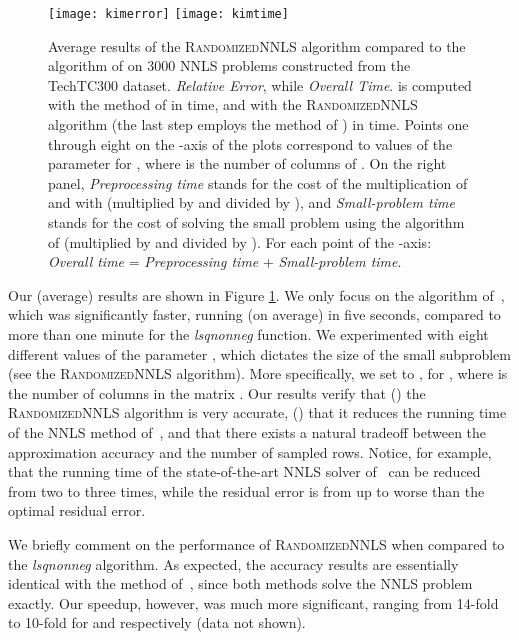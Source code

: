 \documentclass[11pt]{article}
\begin{document}
\begin{figure}
\label{fig:results}
    \begin{center}
    \texttt{[image: kimerror]}
    \texttt{[image: kimtime]}
    \end{center}
    \caption{
    Average results of the \textsc{RandomizedNNLS}
    algorithm compared to the algorithm of \cite{KSD07} on 3000 NNLS
    problems constructed from the TechTC300 dataset.
    \emph{Relative Error}, while \emph{Overall Time}.  is computed with the method of \cite{KSD07} in
     time, and   with the \textsc{RandomizedNNLS} algorithm (the last step employs the method of \cite{KSD07}) in
     time. Points one through eight on the -axis of the plots
    correspond to values of the parameter  for , where  is the number of columns of .
    On the right panel, \emph{Preprocessing
    time} stands for the cost of the multiplication of  and  with  (multiplied by  and divided by ), and \emph{Small-problem time} stands
    for the cost of solving the small problem using the algorithm
    of \cite{KSD07} (multiplied by  and divided by ). For each point of the -axis: \emph{Overall time} = \emph{Preprocessing
    time} +  \emph{Small-problem time}.}\label{fig:fig1}
\end{figure}

Our (average) results are shown in Figure \ref{fig:fig1}. We only
focus on the algorithm of~\cite{KSD07}, which was significantly
faster, running (on average) in five seconds, compared to more
than one minute for the \emph{lsqnonneg} function. We experimented
with eight different values of the parameter , which dictates
the size of the small subproblem (see the \textsc{RandomizedNNLS}
algorithm). More specifically, we set  to , for
, where  is the number of columns in the matrix
. Our results verify that () the \textsc{RandomizedNNLS}
algorithm is very accurate, () that it reduces the running
time of the NNLS method of~\cite{KSD07}, and  that there
exists a natural tradeoff between the approximation accuracy and
the number of sampled rows. Notice, for example, that the running
time of the state-of-the-art NNLS solver of~\cite{KSD07} can be
reduced from two to three times, while the residual error is from
 up to  worse than the optimal residual error.

We briefly comment on the performance of \textsc{RandomizedNNLS}
when compared to the \emph{lsqnonneg} algorithm. As expected, the
accuracy results are essentially identical with the method
of~\cite{KSD07}, since both methods solve the NNLS problem
exactly. Our speedup, however, was much more significant, ranging
from 14-fold to 10-fold for  and 
respectively (data not shown).
\end{document}
